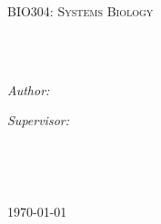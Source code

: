 \documentclass[
12pt, %
oneside, %
english, %
onehalfspacing, %
toctotoc, %
parskip, %
headsepline, %
chapterinoneline, %
consistentlayout, %
]{MastersDoctoralThesis} %
\author{Siyuan \textsc{Guo} 11611118 } %
\begin{document}
\frontmatter %

\pagestyle{plain} %




\begin{titlepage}
\begin{center}

\vspace*{.06\textheight}
{\scshape\LARGE \univname\par}\vspace{1.5cm} %
\textsc{\Large BIO304: Systems Biology}\\[0.5cm] %

\HRule \\[0.4cm] %
{\huge \bfseries \ttitle\par}\vspace{0.4cm} %
\HRule \\[1.5cm] %
 
\begin{minipage}[t]{0.4\textwidth}
\begin{flushleft} \large
\emph{Author:}\\
\href{http://www.johnsmith.com}{\authorname} %
\end{flushleft}
\end{minipage}
\begin{minipage}[t]{0.4\textwidth}
\begin{flushright} \large
\emph{Supervisor:} \\
\href{http://www.jamessmith.com}{\supname} %
\end{flushright}
\end{minipage}\\[6cm]
 
\vfill

\Large \deptname\\[1cm] %
 
\vfill

{\large \today}\\[1cm] %
 
\end{center}
\end{titlepage}
\end{document}
